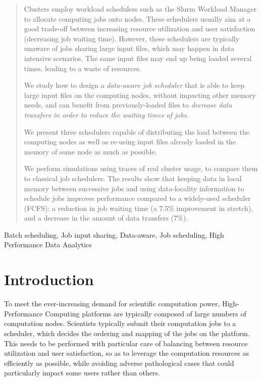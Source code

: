 \documentclass[conference]{IEEEtran}
\begin{document}
\begin{abstract}
  Clusters employ workload schedulers such as
  the Slurm Workload Manager to allocate computing jobs onto
  nodes. These schedulers usually aim at a good trade-off between
  increasing resource utilization and user satisfaction (decreasing
  job waiting time). However, these schedulers are typically unaware
  of jobs sharing large input files, which may happen in data
  intensive scenarios. The same input files may end up being loaded several
  times, leading to a waste of resources.
   
  We study how to design a \textit{data-aware job scheduler} that is
  able to keep large input files on the computing nodes, without
  impacting other memory needs, and can benefit from previously-loaded files to
  \textit{decrease data transfers in order to reduce the waiting times of jobs}.

  We present three schedulers capable of distributing the load between
  the computing nodes as well as re-using input files already loaded
  in the memory of some node as much as possible.
  
  We perform simulations using traces of real cluster usage, to compare
  them to classical job schedulers. The results show that
  keeping data in local memory between successive jobs and using data-locality
  information to schedule jobs improves performance compared
  to a widely-used scheduler (FCFS): a reduction in job waiting time
  (a 7.5\% improvement in stretch), and a decrease in the
  amount of data transfers (7\%).

\end{abstract}

\begin{IEEEkeywords}
Batch scheduling,
Job input sharing,
Data-aware,
Job scheduling,
High Performance Data Analytics
\end{IEEEkeywords}

\section{Introduction}\label{sec.introduction}

To meet the ever-increasing demand for scientific computation power,
High-Performance Computing platforms are typically composed of large
numbers of computation nodes. Scientists typically submit their
computation jobs to a scheduler, which decides the ordering and mapping
of the jobs on the platform. This needs to be performed with particular
care of balancing between resource utilization and user satisfaction, so
as to leverage the computation resources as efficiently as possible,
while avoiding adverse pathological cases that could particularly impact
some users rather than others.
\end{document}
